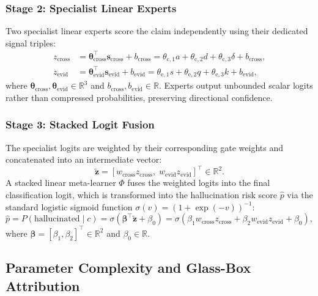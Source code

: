 \documentclass[pdflatex,sn-mathphys,Numbered]{sn-jnl}
\begin{document}
\subsubsection{Stage 2: Specialist Linear Experts}
Two specialist linear experts score the claim independently using their dedicated signal triples:
\begin{align}
z_{\mathrm{cross}} &= \boldsymbol{\theta}_{\mathrm{cross}}^{\top}\mathbf{s}_{\mathrm{cross}} + b_{\mathrm{cross}} = \theta_{\mathrm{c},1} a + \theta_{\mathrm{c},2} d + \theta_{\mathrm{c},3} \delta + b_{\mathrm{cross}}, \\
z_{\mathrm{evid}} &= \boldsymbol{\theta}_{\mathrm{evid}}^{\top}\mathbf{s}_{\mathrm{evid}} + b_{\mathrm{evid}} = \theta_{\mathrm{e},1} s + \theta_{\mathrm{e},2} q + \theta_{\mathrm{e},3} k + b_{\mathrm{evid}},
\end{align}
where $\boldsymbol{\theta}_{\mathrm{cross}}, \boldsymbol{\theta}_{\mathrm{evid}} \in \mathbb{R}^3$ and $b_{\mathrm{cross}}, b_{\mathrm{evid}} \in \mathbb{R}$. Experts output unbounded scalar logits rather than compressed probabilities, preserving directional confidence.

\subsubsection{Stage 3: Stacked Logit Fusion}
The specialist logits are weighted by their corresponding gate weights and concatenated into an intermediate vector:
\begin{equation}
\tilde{\mathbf{z}} = [w_{\mathrm{cross}} z_{\mathrm{cross}}, \; w_{\mathrm{evid}} z_{\mathrm{evid}}]^{\top} \in \mathbb{R}^2.
\end{equation}
A stacked linear meta-learner $\Phi$ fuses the weighted logits into the final classification logit, which is transformed into the hallucination risk score $\hat{p}$ via the standard logistic sigmoid function $\sigma(v) = (1 + \exp(-v))^{-1}$:
\begin{equation}
\hat{p} = P(\text{hallucinated} \mid c) = \sigma\left(\boldsymbol{\beta}^{\top} \tilde{\mathbf{z}} + \beta_0\right) = \sigma\left(\beta_1 w_{\mathrm{cross}} z_{\mathrm{cross}} + \beta_2 w_{\mathrm{evid}} z_{\mathrm{evid}} + \beta_0\right),
\end{equation}
where $\boldsymbol{\beta} = [\beta_1, \beta_2]^{\top} \in \mathbb{R}^2$ and $\beta_0 \in \mathbb{R}$.

\subsection{Parameter Complexity and Glass-Box Attribution}\label{subsec:glass_box}
\end{document}
